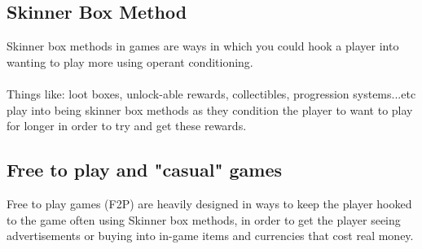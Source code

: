 \documentclass{scrartcl}
\begin{document}
\subsection{Skinner Box Method}
Skinner box methods in games are ways in which you could hook a player into wanting to play more using operant conditioning. \cite{SkinnerBox}
\\
\\
Things like: loot boxes, unlock-able rewards, collectibles, progression systems...etc play into being skinner box methods as they condition the player to want to play for longer in order to try and get these rewards.
\cite{AddictiveDesign4}

\subsection{Free to play and "casual" games}
Free to play games (F2P) are heavily designed in ways to keep the player hooked to the game often using Skinner box methods, in order to get the player seeing advertisements or buying into in-game items and currencies that cost real money.\cite{FreeToPlay} \cite{Ethics2}
\end{document}
